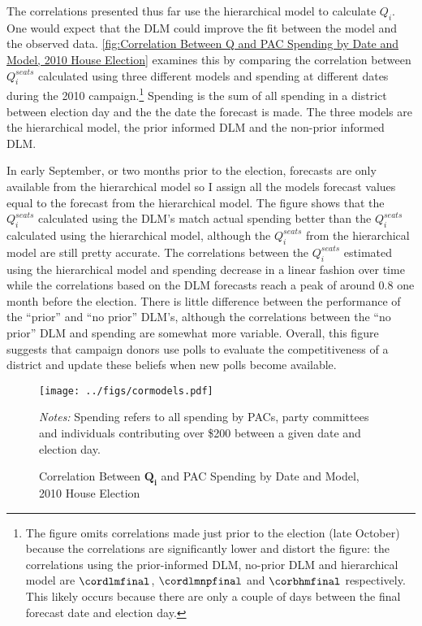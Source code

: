 \documentclass[12pt,final,fleqn]{article}
\theoremstyle{plain}
\begin{document}
The correlations presented thus far use the hierarchical model to calculate $Q_i$. One would expect that the DLM could improve the fit between the model and the observed data. \autoref{fig:Correlation Between Q and PAC Spending by Date and Model, 2010 House Election} examines this by comparing the correlation between $Q_i^{seats}$ calculated using three different models and spending at different dates during the 2010 campaign.\footnote{The figure omits correlations made just prior to the election (late October) because the correlations are significantly lower and distort the figure: the correlations using the prior-informed DLM, no-prior DLM and hierarchical model are $\cordlmfinal$, $\cordlmnpfinal$ and $\corbhmfinal$ respectively. This likely occurs because there are only a couple of days between the final forecast date and election day.} Spending is the sum of all spending in a district between election day and the the date the forecast is made. The three models are the hierarchical model, the prior informed DLM and the non-prior informed DLM. 

In early September, or two months prior to the election, forecasts are only available from the hierarchical model so I assign all the models forecast values equal to the forecast from the hierarchical model. The figure shows that the $Q_i^{seats}$ calculated using the DLM's match actual spending better than the $Q_i^{seats}$ calculated using the hierarchical model, although the $Q_i^{seats}$ from the hierarchical model are still pretty accurate. The correlations between the $Q_i^{seats}$ estimated using the hierarchical model and spending decrease in a linear fashion over time while the correlations based on the DLM forecasts reach a peak of around 0.8 one month before the election.  There is little difference between the performance of the ``prior'' and ``no prior'' DLM's, although the correlations between the ``no prior'' DLM and spending are somewhat more variable. Overall, this figure suggests that campaign donors use polls to evaluate the competitiveness of a district and update these beliefs when new polls become available.

\begin{figure}[!htb]
\texttt{[image: ../figs/cormodels.pdf]}
\vspace{.5cm}
\caption{Correlation Between $\mathbf{Q_i}$ and PAC Spending by Date and Model, 2010 House Election}
\label{fig:Correlation Between Q and PAC Spending by Date and Model, 2010 House Election}
\begin{minipage}{\linewidth}
\footnotesize
\emph{Notes:} Spending refers to all spending by PACs, party committees and individuals contributing over \$200 between a given date and election day.
\end{minipage}
\end{figure}
\end{document}
